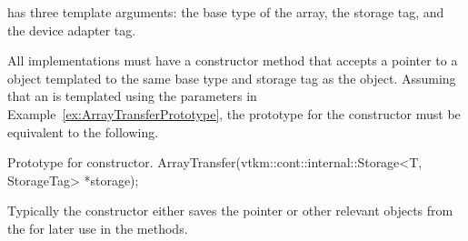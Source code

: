  has three template arguments: the base type
of the array, the storage tag, and the device adapter tag.


All  implementations must have a
constructor method that accepts a pointer to a 
object templated to the same base type and storage tag as the
 object. Assuming that an
 is templated using the parameters in
Example~\ref{ex:ArrayTransferPrototype}, the prototype for the constructor
must be equivalent to the following.
\begin{vtkmexample}{Prototype for  constructor.}
ArrayTransfer(vtkm::cont::internal::Storage<T, StorageTag> *storage);
\end{vtkmexample}
Typically the constructor either saves the  pointer
or other relevant objects from the  for later use in
the methods.

